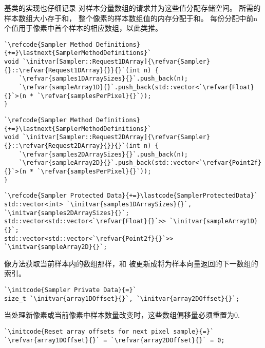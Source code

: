 基类的实现也仔细记录
对样本分量数组的请求并为这些值分配存储空间。
所需的样本数组大小存于和，
整个像素的样本数组值的内存分配于和。
每份分配中前{\ttfamily n}个值用于像素中首个样本的相应数组，以此类推。
\begin{lstlisting}
`\refcode{Sampler Method Definitions}{+=}\lastnext{SamplerMethodDefinitions}`
void `\initvar[Sampler::Request1DArray]{\refvar{Sampler}{}::\refvar{Request1DArray}{}}{}`(int n) {
    `\refvar{samples1DArraySizes}{}`.push_back(n);
    `\refvar{sampleArray1D}{}`.push_back(std::vector<`\refvar{Float}{}`>(n * `\refvar{samplesPerPixel}{}`));
}
\end{lstlisting}
\begin{lstlisting}
`\refcode{Sampler Method Definitions}{+=}\lastnext{SamplerMethodDefinitions}`
void `\initvar[Sampler::Request2DArray]{\refvar{Sampler}{}::\refvar{Request2DArray}{}}{}`(int n) {
    `\refvar{samples2DArraySizes}{}`.push_back(n);
    `\refvar{sampleArray2D}{}`.push_back(std::vector<`\refvar{Point2f}{}`>(n * `\refvar{samplesPerPixel}{}`));
}
\end{lstlisting}
\begin{lstlisting}
`\refcode{Sampler Protected Data}{+=}\lastcode{SamplerProtectedData}`
std::vector<int> `\initvar{samples1DArraySizes}{}`, `\initvar{samples2DArraySizes}{}`;
std::vector<std::vector<`\refvar{Float}{}`>> `\initvar{sampleArray1D}{}`;
std::vector<std::vector<`\refvar{Point2f}{}`>> `\initvar{sampleArray2D}{}`;
\end{lstlisting}

像方法获取当前样本内的数组那样，和
被更新成将为样本向量返回的下一数组的索引。
\begin{lstlisting}
`\initcode{Sampler Private Data}{=}`
size_t `\initvar{array1DOffset}{}`, `\initvar{array2DOffset}{}`;
\end{lstlisting}
当处理新像素或当前像素中样本数量改变时，这些数组偏移量必须重置为0.
\begin{lstlisting}
`\initcode{Reset array offsets for next pixel sample}{=}`
`\refvar{array1DOffset}{}` = `\refvar{array2DOffset}{}` = 0;
\end{lstlisting}

